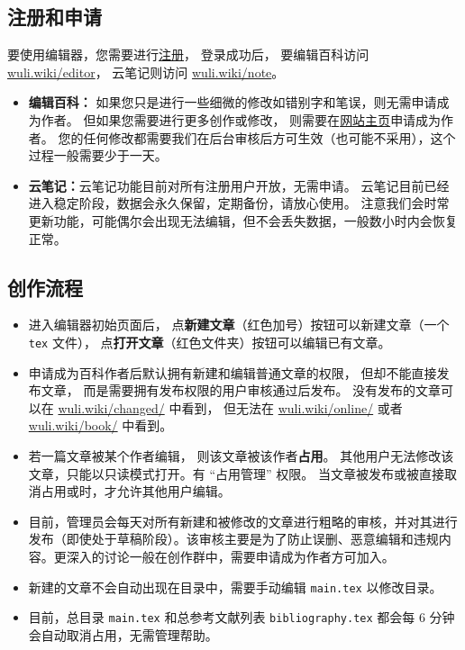 \subsection{注册和申请}
要使用编辑器，您需要进行\href{https://wuli.wiki/forum}{注册}， 登录成功后， 要编辑百科访问 \href{https://wuli.wiki/editor/}{wuli.wiki/editor}， 云笔记则访问 \href{https://wuli.wiki/note/}{wuli.wiki/note}。
\begin{itemize}
\item \textbf{编辑百科：} 如果您只是进行一些细微的修改如错别字和笔误，则无需申请成为作者。 但如果您需要进行更多创作或修改， 则需要在\href{https://wuli.wiki}{网站主页}申请成为作者。 您的任何修改都需要我们在后台审核后方可生效（也可能不采用），这个过程一般需要少于一天。
\item \textbf{云笔记：}云笔记功能目前对所有注册用户开放，无需申请。 云笔记目前已经进入稳定阶段，数据会永久保留，定期备份，请放心使用。 注意我们会时常更新功能，可能偶尔会出现无法编辑，但不会丢失数据，一般数小时内会恢复正常。
\end{itemize}

\subsection{创作流程}
\begin{itemize}
\item 进入编辑器初始页面后， 点\textbf{新建文章}（红色加号）按钮可以新建文章（一个 \verb`tex` 文件）， 点\textbf{打开文章}（红色文件夹）按钮可以编辑已有文章。
\item 申请成为百科作者后默认拥有新建和编辑普通文章的权限， 但却不能直接发布文章， 而是需要拥有发布权限的用户审核通过后发布。 没有发布的文章可以在 \href{http://wuli.wiki/changed/}{wuli.wiki/changed/} 中看到， 但无法在 \href{http://wuli.wiki/changed/}{wuli.wiki/online/} 或者 \href{http://wuli.wiki/book/}{wuli.wiki/book/} 中看到。
\item 若一篇文章被某个作者编辑， 则该文章被该作者\textbf{占用}。 其他用户无法修改该文章，只能以只读模式打开。有 “占用管理” 权限。 当文章被发布或被直接取消占用或时，才允许其他用户编辑。
\item 目前，管理员会每天对所有新建和被修改的文章进行粗略的审核，并对其进行发布（即使处于草稿阶段）。该审核主要是为了防止误删、恶意编辑和违规内容。更深入的讨论一般在创作群中，需要申请成为作者方可加入。
\item 新建的文章不会自动出现在目录中，需要手动编辑 \verb`main.tex` 以修改目录。
\item 目前，总目录 \verb`main.tex` 和总参考文献列表 \verb`bibliography.tex` 都会每 6 分钟会自动取消占用，无需管理帮助。
\end{itemize}

